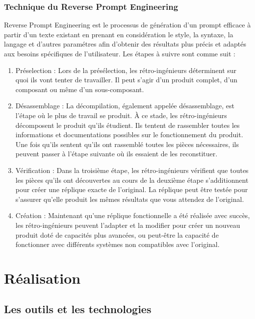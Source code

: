 \documentclass[11,5pt]{report}
\begin{document}
\begin{spacing}{2}
\subsection{Technique du Reverse Prompt Engineering}
Reverse Prompt Engineering\cite{RPE} est le processus de génération d'un prompt efficace à partir d'un texte existant en prenant en considération le style, la syntaxe, la langage et d'autres paramétres afin d'obtenir des résultats plus précis et adaptés aux besoins spécifiques de l'utilisateur. Les étapes à suivre sont comme suit : 
\begin{enumerate}
    \item Préselection : Lors de la présélection, les rétro-ingénieurs déterminent sur quoi ils vont tenter de travailler. Il peut s'agir d'un produit complet, d'un composant ou même d'un sous-composant.
    \item Désassemblage : La décompilation, également appelée désassemblage, est l'étape où le plus de travail se produit. À ce stade, les rétro-ingénieurs décomposent le produit qu'ils étudient. Ils tentent de rassembler toutes les informations et documentations possibles sur le fonctionnement du produit. Une fois qu'ils sentent qu'ils ont rassemblé toutes les pièces nécessaires, ils peuvent passer à l'étape suivante où ils essaient de les reconstituer.
    \item Vérification : Dans la troisième étape, les rétro-ingénieurs vérifient que toutes les pièces qu'ils ont découvertes au cours de la deuxième étape s'additionnent pour créer une réplique exacte de l'original. La réplique peut être testée pour s'assurer qu'elle produit les mêmes résultats que vous attendez de l'original.
    \item Création : Maintenant qu'une réplique fonctionnelle a été réalisée avec succès, les rétro-ingénieurs peuvent l'adapter et la modifier pour créer un nouveau produit doté de capacités plus avancées, ou peut-être la capacité de fonctionner avec différents systèmes non compatibles avec l'original.

\end{enumerate}

\chapter{Réalisation}
\section{Les outils et les technologies}


\end{spacing}
\end{document}
